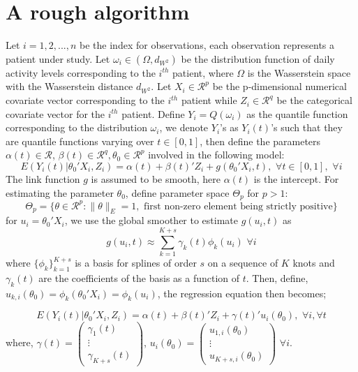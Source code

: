 \documentclass{article}
\begin{document}
\section{A rough algorithm}
Let $i=1,2,...,n$ be the index for observations, each observation represents a patient under study. Let $\omega_i \in (\Omega,d_{W^2})$ be the distribution function of daily activity levels corresponding to the $i^{th}$ patient, where $\Omega$ is the Wasserstein space with the Wasserstein distance $d_{W^2}$. Let $X_i\in \mathcal{R}^p$ be the p-dimensional numerical covariate vector corresponding to the $i^{th}$ patient while $Z_i \in \mathcal{R}^q$ be the categorical covariate vector for the $i^{th}$ patient. Define $Y_i=Q(\omega_i)$ as the quantile function corresponding to the distribution $\omega_i$, we denote $Y_i$'s as $Y_i(t)$'s such that they are quantile functions varying over $t \in [0,1]$, then define the parameters $\alpha(t)\in \mathcal{R}$, $\beta(t) \in \mathcal{R}^q,\theta_0 \in \mathcal{R}^p$ involved in the following model:
\begin{equation}
E(Y_i(t)|\theta_0'X_i,Z_i)=\alpha(t) + \beta(t)'Z_i+g(\theta_0'X_i,t),\,\,\forall t\in [0,1],\,\,\forall
i
\label{eq:wass_regression_model}
\end{equation} The link function $g$ is assumed to be smooth, here $\alpha(t)$ is the intercept. For estimating the parameter $\theta_0$, define parameter space $\Theta_p$ for $p>1$: $$\Theta_p=\{\theta\in \mathcal{R}^p: \|\theta\|_E=1, \text{ first non-zero element being strictly positive} \}$$  
for $u_i=\theta_0'X_i$, we use the global smoother to estimate $g(u_i,t)$ as $$g(u_i,t) \approx \sum_{k=1}^{K+s}\gamma_k(t)\phi_k(u_i)\,\,\forall i$$ where $\{\phi_k\}_{k=1}^{K+s}$ is a basis for splines of order $s$ on a sequence of $K$ knots and $\gamma_k(t)$ are the coefficients of the basis as a function of $t$. Then, define, $u_{k,i}(\theta_0)=\phi_k(\theta_0'X_i)=\phi_k(u_i)$, the regression equation then becomes;

\begin{equation}
E(Y_i(t)|\theta_0'X_i,Z_i)=\alpha(t)+\beta(t)'Z_i+\gamma(t)'u_i(\theta_0),\,\,\forall i,\forall t
\label{eq:wass_regression_basis}
\end{equation} where, $\gamma(t)=\left(\begin{array}{c}
\gamma_{1}(t) \\
\vdots \\
\gamma_{K+s}(t)
\end{array}\right)$, $u_i(\theta_0)=\left(\begin{array}{c}
u_{1,i}(\theta_0) \\
\vdots \\
u_{K+s,i}(\theta_0)
\end{array}\right)\,\,\forall i$.
\end{document}
